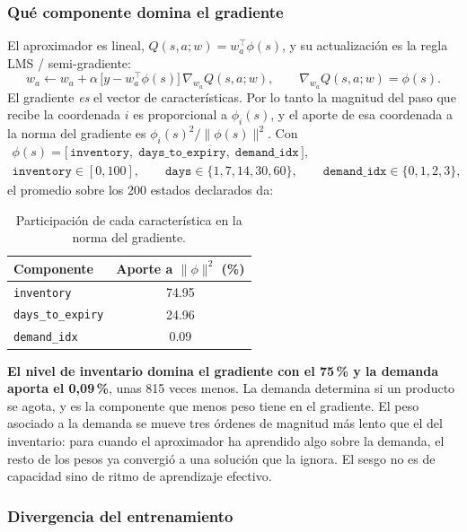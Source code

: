 \documentclass[11pt,letterpaper]{article}
\begin{document}
\subsubsection*{Qué componente domina el gradiente}

El aproximador es lineal, $Q(s,a;w) = w_a^{\top}\phi(s)$, y su actualización es la
regla LMS / semi-gradiente:
\[
  w_a \leftarrow w_a + \alpha\,\bigl[y - w_a^{\top}\phi(s)\bigr]\,
  \nabla_{w_a} Q(s,a;w),
  \qquad \nabla_{w_a} Q(s,a;w) = \phi(s).
\]
El gradiente \emph{es} el vector de características. Por lo tanto la magnitud del
paso que recibe la coordenada $i$ es proporcional a $\phi_i(s)$, y el aporte de esa
coordenada a la norma del gradiente es $\phi_i(s)^2 / \lVert\phi(s)\rVert^2$. Con
\begin{gather*}
  \phi(s) = \bigl[\,\texttt{inventory},\;\texttt{days\_to\_expiry},\;
  \texttt{demand\_idx}\,\bigr], \\[0.3em]
  \texttt{inventory} \in [0,100],\qquad
  \texttt{days} \in \{1,7,14,30,60\},\qquad
  \texttt{demand\_idx} \in \{0,1,2,3\},
\end{gather*}
el promedio sobre los 200 estados declarados da:

\begin{table}[h]
\centering
\begin{tabular}{lS[table-format=2.2]}
\toprule
\textbf{Componente} & {\textbf{Aporte a} $\lVert\phi\rVert^2$ \textbf{(\%)}} \\
\midrule
\texttt{inventory}       & 74.95 \\
\texttt{days\_to\_expiry} & 24.96 \\
\texttt{demand\_idx}      & 0.09 \\
\bottomrule
\end{tabular}
\caption{Participación de cada característica en la norma del gradiente.}
\end{table}

\noindent
\textbf{El nivel de inventario domina el gradiente con el 75\,\% y la demanda aporta
el 0{,}09\,\%}, unas 815 veces menos. La demanda determina si un producto se agota,
y es la componente que menos peso tiene en el gradiente. El peso asociado a la
demanda se mueve tres órdenes de magnitud más lento que el del inventario: para
cuando el aproximador ha aprendido algo sobre la demanda, el resto de los pesos ya
convergió a una solución que la ignora. El sesgo no es de capacidad sino de ritmo
de aprendizaje efectivo.

\subsubsection*{Divergencia del entrenamiento}
\end{document}
